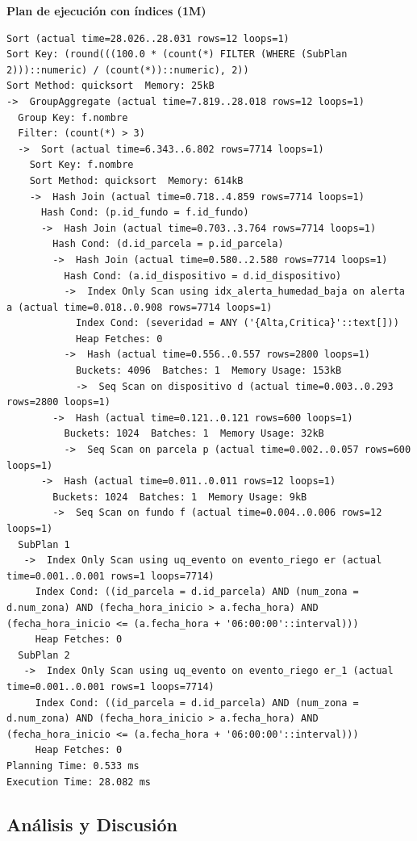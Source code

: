 \documentclass[11pt,letterpaper]{article}
\begin{document}
\textbf{Plan de ejecución con índices (1M)}
\begin{lstlisting}[style=plano]
Sort (actual time=28.026..28.031 rows=12 loops=1)
Sort Key: (round(((100.0 * (count(*) FILTER (WHERE (SubPlan 2)))::numeric) / (count(*))::numeric), 2))
Sort Method: quicksort  Memory: 25kB
->  GroupAggregate (actual time=7.819..28.018 rows=12 loops=1)
  Group Key: f.nombre
  Filter: (count(*) > 3)
  ->  Sort (actual time=6.343..6.802 rows=7714 loops=1)
    Sort Key: f.nombre
    Sort Method: quicksort  Memory: 614kB
    ->  Hash Join (actual time=0.718..4.859 rows=7714 loops=1)
      Hash Cond: (p.id_fundo = f.id_fundo)
      ->  Hash Join (actual time=0.703..3.764 rows=7714 loops=1)
        Hash Cond: (d.id_parcela = p.id_parcela)
        ->  Hash Join (actual time=0.580..2.580 rows=7714 loops=1)
          Hash Cond: (a.id_dispositivo = d.id_dispositivo)
          ->  Index Only Scan using idx_alerta_humedad_baja on alerta a (actual time=0.018..0.908 rows=7714 loops=1)
            Index Cond: (severidad = ANY ('{Alta,Critica}'::text[]))
            Heap Fetches: 0
          ->  Hash (actual time=0.556..0.557 rows=2800 loops=1)
            Buckets: 4096  Batches: 1  Memory Usage: 153kB
            ->  Seq Scan on dispositivo d (actual time=0.003..0.293 rows=2800 loops=1)
        ->  Hash (actual time=0.121..0.121 rows=600 loops=1)
          Buckets: 1024  Batches: 1  Memory Usage: 32kB
          ->  Seq Scan on parcela p (actual time=0.002..0.057 rows=600 loops=1)
      ->  Hash (actual time=0.011..0.011 rows=12 loops=1)
        Buckets: 1024  Batches: 1  Memory Usage: 9kB
        ->  Seq Scan on fundo f (actual time=0.004..0.006 rows=12 loops=1)
  SubPlan 1
   ->  Index Only Scan using uq_evento on evento_riego er (actual time=0.001..0.001 rows=1 loops=7714)
     Index Cond: ((id_parcela = d.id_parcela) AND (num_zona = d.num_zona) AND (fecha_hora_inicio > a.fecha_hora) AND (fecha_hora_inicio <= (a.fecha_hora + '06:00:00'::interval)))
     Heap Fetches: 0
  SubPlan 2
   ->  Index Only Scan using uq_evento on evento_riego er_1 (actual time=0.001..0.001 rows=1 loops=7714)
     Index Cond: ((id_parcela = d.id_parcela) AND (num_zona = d.num_zona) AND (fecha_hora_inicio > a.fecha_hora) AND (fecha_hora_inicio <= (a.fecha_hora + '06:00:00'::interval)))
     Heap Fetches: 0
Planning Time: 0.533 ms
Execution Time: 28.082 ms
\end{lstlisting}


\subsection{Análisis y Discusión}
\label{sec:discusion}
\end{document}
